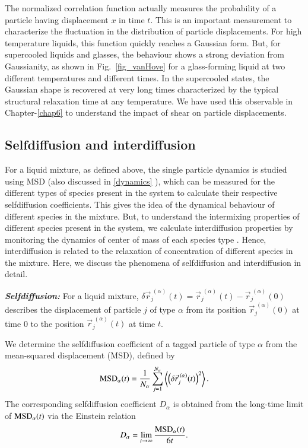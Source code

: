     The normalized correlation function actually measures the probability of a particle having displacement $x$ in time $t$. This is an important measurement to characterize the fluctuation in the distribution of particle displacements. For high temperature liquids, this function quickly reaches a Gaussian form. But, for supercooled liquids and glasses, the behaviour shows a strong deviation from Gaussianity, as shown in Fig.~\ref{fig_vanHove} for a glass-forming liquid at two different temperatures and different times. In the supercooled states, the Gaussian shape is recovered at very long times characterized by the typical structural relaxation time at any temperature. We have used this observable in Chapter-\ref{chap6} to understand the impact of shear on particle displacements. 
    
    \subsection{Selfdiffusion and interdiffusion}\label{selfInter}
    
    For a liquid mixture, as defined above, the single particle dynamics is studied using MSD (also discussed in \ref{dynamics} ), which can be measured for the different types of species present in the system to calculate their respective selfdiffusion coefficients. This gives the idea of the dynamical  behaviour of different species in the mixture. But, to understand the intermixing properties of different species present in the system,  we calculate interdiffusion properties by monitoring the dynamics of center of mass of each species type \cite{interdiff}. Hence, interdiffusion is related to the relaxation of concentration of different species in the mixture. Here, we discuss the phenomena of selfdiffusion and interdiffusion in detail.

    {\bf \em Selfdiffusion:} For a liquid mixture, $\delta \vec{r}_j^{\; (\alpha)}(t)= \vec{r}_j^{\; (\alpha)}(t) - \vec{r}_j^{\; (\alpha)}(0)$ describes the displacement of particle $j$ of type $\alpha$ from its position $\vec{r}_j^{\; (\alpha)}(0)$ at time 0 to the position $\vec{r}_j^{\; (\alpha)}(t)$ at time $t$.
    
    We determine the selfdiffusion coefficient of a tagged particle of type $\alpha$ from the mean-squared displacement (MSD), defined by
    \begin{equation}
    \label{eq_msd}
    { {\rm MSD}_\alpha (t) =  \frac{1}{N_{\alpha}}  \sum_{j=1}^{N_\alpha} \left\langle \left( \delta \vec{r}_j^{\; (\alpha)}(t) \right)^2 \right\rangle} \, .
    \end{equation}
    The corresponding selfdiffusion coefficient $D_\alpha$ is obtained from the long-time limit of {${\rm MSD}_{\alpha}(t)$} via the Einstein relation \cite{hansen2013, binder2011}
    \begin{equation}
    { D_{\alpha} = \lim_{t \to \infty} \frac{{\rm MSD}_{\alpha}(t)}{6t}.}
    \label{eq_ds}
    \end{equation}
    

